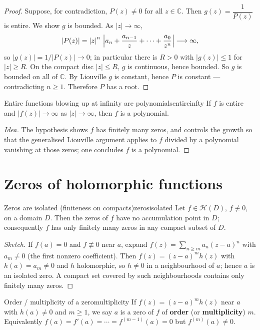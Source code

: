 \documentclass[11pt,openany]{report}
\newcommand{\C}{\mathbb{C}}
\newcommand{\abs}[1]{\left\lvert #1 \right\rvert}
\newcommand{\To}{\longrightarrow}
\newcommand{\Hol}{\mathcal{H}}
\begin{document}
\begin{proof}
Suppose, for contradiction, $P(z)\ne0$ for all $z\in\C$. Then $g(z)=\dfrac{1}{P(z)}$ is
entire. We show $g$ is bounded. As $\abs z\to\infty$,
\[
  \abs{P(z)} = \abs{z}^n\,\Bigl\lvert a_n + \frac{a_{n-1}}{z}+\cdots+\frac{a_0}{z^n}\Bigr\rvert
  \To \infty,
\]
so $\abs{g(z)}=1/\abs{P(z)}\to0$; in particular there is $R>0$ with $\abs{g(z)}\le1$ for
$\abs z\ge R$. On the compact disc $\abs z\le R$, $g$ is continuous, hence bounded. So $g$
is bounded on all of $\C$. By Liouville $g$ is constant, hence $P$ is constant ---
contradicting $n\ge1$. Therefore $P$ has a root.
\end{proof}

\begin{theorem}{Entire functions blowing up at infinity are polynomials}{entireinfty}
If $f$ is entire and $\abs{f(z)}\to\infty$ as $\abs z\to\infty$, then $f$ is a polynomial.
\end{theorem}

\begin{proof}[Idea]
The hypothesis shows $f$ has finitely many zeros, and controls the growth so that the
generalised Liouville argument applies to $f$ divided by a polynomial vanishing at those
zeros; one concludes $f$ is a polynomial.
\end{proof}

\section{Zeros of holomorphic functions}

\begin{lemma}{Zeros are isolated (finiteness on compacts)}{zerosisolated}
Let $f\in\Hol(D)$, $f\not\equiv0$, on a domain $D$. Then the zeros of $f$ have no
accumulation point in $D$; consequently $f$ has only finitely many zeros in any compact
subset of $D$.
\end{lemma}

\begin{proof}[Sketch]
If $f(a)=0$ and $f\not\equiv0$ near $a$, expand $f(z)=\sum_{n\ge m}a_n(z-a)^n$ with
$a_m\ne0$ (the first nonzero coefficient). Then $f(z)=(z-a)^m h(z)$ with $h(a)=a_m\ne0$ and
$h$ holomorphic, so $h\ne0$ in a neighbourhood of $a$; hence $a$ is an isolated zero. A
compact set covered by such neighbourhoods contains only finitely many zeros.
\end{proof}

\begin{definition}{Order / multiplicity of a zero}{multiplicity}
If $f(z)=(z-a)^m h(z)$ near $a$ with $h(a)\ne0$ and $m\ge1$, we say $a$ is a zero of $f$ of
\textbf{order} (or \textbf{multiplicity}) $m$. Equivalently
$f(a)=f'(a)=\cdots=f^{(m-1)}(a)=0$ but $f^{(m)}(a)\ne0$.
\end{definition}
\end{document}
